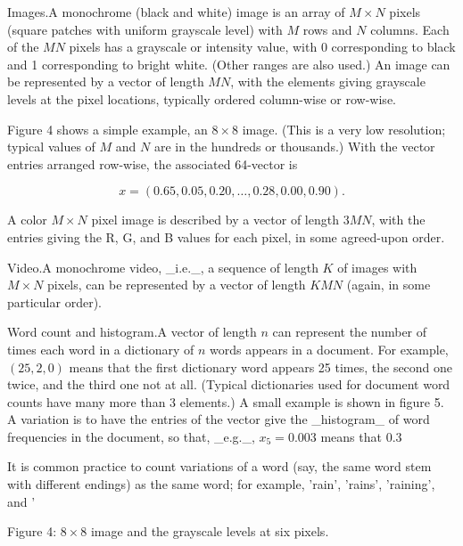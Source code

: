 
Images.A monochrome (black and white) image is an array of \(M\times N\) pixels (square patches with uniform grayscale level) with \(M\) rows and \(N\) columns. Each of the \(MN\) pixels has a grayscale or intensity value, with 0 corresponding to black and 1 corresponding to bright white. (Other ranges are also used.) An image can be represented by a vector of length \(MN\), with the elements giving grayscale levels at the pixel locations, typically ordered column-wise or row-wise.

Figure 4 shows a simple example, an \(8\times 8\) image. (This is a very low resolution; typical values of \(M\) and \(N\) are in the hundreds or thousands.) With the vector entries arranged row-wise, the associated 64-vector is

\[x=(0.65,0.05,0.20,\ldots,0.28,0.00,0.90).\]

A color \(M\times N\) pixel image is described by a vector of length \(3MN\), with the entries giving the R, G, and B values for each pixel, in some agreed-upon order.

Video.A monochrome video, _i.e._, a sequence of length \(K\) of images with \(M\times N\) pixels, can be represented by a vector of length \(KMN\) (again, in some particular order).

Word count and histogram.A vector of length \(n\) can represent the number of times each word in a dictionary of \(n\) words appears in a document. For example, \((25,2,0)\) means that the first dictionary word appears 25 times, the second one twice, and the third one not at all. (Typical dictionaries used for document word counts have many more than 3 elements.) A small example is shown in figure 5. A variation is to have the entries of the vector give the _histogram_ of word frequencies in the document, so that, _e.g._, \(x_{5}=0.003\) means that 0.3%

It is common practice to count variations of a word (say, the same word stem with different endings) as the same word; for example, 'rain', 'rains', 'raining', and '

Figure 4: \(8\times 8\) image and the grayscale levels at six pixels.

 